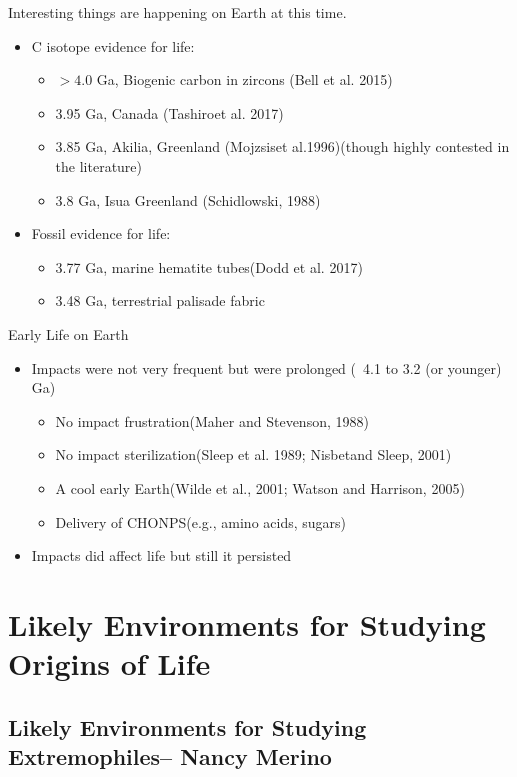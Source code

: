 \documentclass[]{article}
\begin{document}
Interesting things are happening on Earth at this time.

\begin{itemize}
	\item C isotope evidence for life:
	\begin{itemize}
		\item  $>4.0$ Ga, Biogenic carbon in zircons (Bell et al. 2015)
		\item 3.95 Ga, Canada (Tashiroet al. 2017)
		\item 3.85 Ga, Akilia, Greenland (Mojzsiset al.1996)(though highly contested in the literature)
		\item 3.8 Ga, Isua Greenland (Schidlowski, 1988)
	\end{itemize}
	\item Fossil evidence for life: 
	\begin{itemize}
		\item 3.77 Ga, marine hematite tubes(Dodd et al. 2017)
		\item 3.48 Ga, terrestrial palisade fabric
	\end{itemize}
\end{itemize}

Early Life on Earth

\begin{itemize}
	\item Impacts were not very frequent but were prolonged (~4.1 to 3.2 (or younger) Ga)
	\begin{itemize}
		\item No impact frustration(Maher and Stevenson, 1988)
		\item No impact sterilization(Sleep et al. 1989; Nisbetand Sleep, 2001)
		\item A cool early Earth(Wilde et al., 2001; Watson and Harrison, 2005)
		\item Delivery of CHONPS(e.g., amino acids, sugars)
	\end{itemize}
	\item Impacts did affect life but still it persisted
\end{itemize}

\section{Likely Environments for Studying Origins of Life}

\subsection[Likely Environments for Studying Extremophiles]{Likely Environments for Studying Extremophiles-- Nancy Merino}
\end{document}
